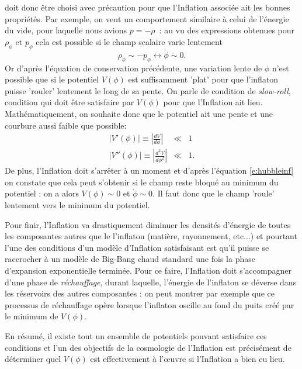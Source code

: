  doit donc être choisi avec précaution pour que l'Inflation associée ait les bonnes propriétés. Par exemple, on veut un comportement similaire à celui de l'énergie du vide, pour laquelle nous avions $p=-\rho$~: au vu des expressions obtenues pour $\rho_\phi$ et $p_\phi$ cela est possible si le champ scalaire varie lentement
\begin{equation}
\rho_\phi\sim -p_\phi \leftrightarrow \dot \phi \sim 0.
\end{equation}
Or d'après l'équation de conservation précédente, une variation lente de $\phi$ n'est possible que si le potentiel $V(\phi)$ est suffisamment 'plat' pour que l'inflaton puisse 'rouler' lentement le long de sa pente. On parle de condition de \textit{slow-roll}, condition qui doit être satisfaire par $V(\phi)$ pour que l'Inflation ait lieu. Mathématiquement, on souhaite donc que le potentiel ait une pente et une courbure aussi faible que possible:
\begin{eqnarray}
|V'(\phi)|\equiv|\frac{d V}{d\phi}| &\ll& 1\\
|V''(\phi)|\equiv|\frac{d ^2 V}{d\phi^2}| &\ll& 1.
\end{eqnarray}
De plus, l'Inflation doit s'arrêter à un moment et d'après l'équation \ref{e:hubbleinf} on constate que cela peut s'obtenir si le champ reste bloqué au minimum du potentiel : on a alors $V(\phi)\sim 0$ et $\dot \phi \sim 0$. Il faut donc que le champ 'roule' lentement vers le minimum du potentiel. 

Pour finir, l'Inflation va drastiquement diminuer les densités d'énergie de toutes les composantes autres que le l'inflaton (matière, rayonnement, etc...) et pourtant l'une des conditions d'un modèle d'Inflation satisfaisant est qu'il puisse se raccrocher à un modèle de Big-Bang chaud standard une fois la phase d'expansion exponentielle terminée. Pour ce faire, l'Inflation doit s'accompagner d'une phase de \textit{réchauffage}, durant laquelle, l'énergie de l'inflaton se déverse dans les réservoirs des autres composantes : on peut montrer par exemple que ce processus de réchauffage opère lorsque l'inflaton oscille au fond du puits créé par le minimum de $V(\phi)$.


En résumé, il existe tout un ensemble de potentiels pouvant satisfaire ces conditions et l'un des objectifs de la cosmologie de l'Inflation est précisément de déterminer quel $V(\phi)$ est effectivement à l'œuvre si l'Inflation a bien eu lieu.



